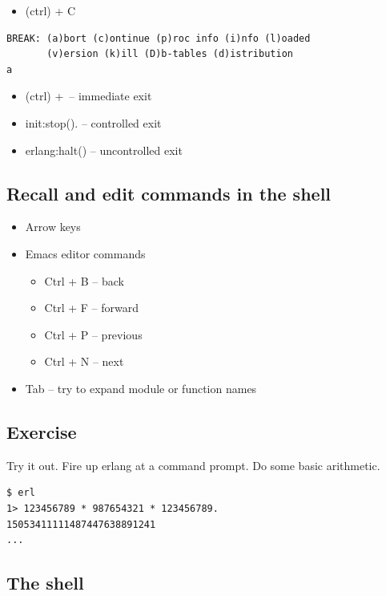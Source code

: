 \documentclass[12pt]{article}
\begin{document}
\begin{itemize}
\item (ctrl) + C
\end{itemize}

\begin{verbatim}
BREAK: (a)bort (c)ontinue (p)roc info (i)nfo (l)oaded
       (v)ersion (k)ill (D)b-tables (d)istribution
a
\end{verbatim}

\begin{itemize}
\item (ctrl) +\ -- immediate exit
\item init:stop(). -- controlled exit
\item erlang:halt() -- uncontrolled exit
\end{itemize}

\subsection{Recall and edit commands in the shell}

\begin{itemize}
\item Arrow keys
\item Emacs editor commands
\begin{itemize}
\item Ctrl + B -- back
\item Ctrl + F -- forward
\item Ctrl + P -- previous
\item Ctrl + N -- next
\end{itemize}
\item Tab -- try to expand module or function names
\end{itemize}

\subsection{Exercise}

Try it out. Fire up erlang at a command prompt. Do some basic arithmetic.

\begin{verbatim}
$ erl
1> 123456789 * 987654321 * 123456789.
15053411111487447638891241
...
\end{verbatim}

\subsection{The shell}
\end{document}
